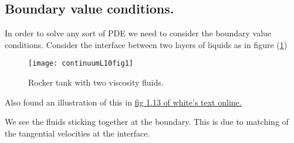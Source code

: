 \subsection{Boundary value conditions.}

In order to solve any sort of PDE we need to consider the boundary value conditions.  Consider the interface between two layers of liquids as in figure (\ref{fig:continuumL9:continuumL10fig1})

\begin{figure}[htp]
   \centering
   \texttt{[image: continuumL10fig1]}
   \caption{Rocker tank with two viscosity fluids.}\label{fig:continuumL9:continuumL10fig1}
\end{figure}

Also found an illustration of this in \href{watinst.ut.ac.ir/downloads/pdf/ebooks/white.pdf}{fig 1.13 of white's text online.}

We see the fluids sticking together at the boundary.  This is due to matching of the tangential velocities at the interface.

\EndArticle
